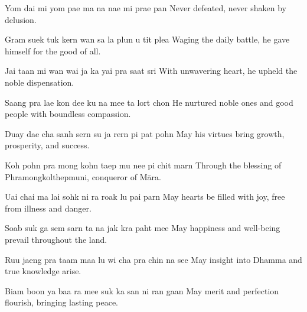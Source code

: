 \begin{chantsubsection}
\chantlinepair
{Yom dai mi yom pae}
{ma na nae mi prae pan}
{Never defeated, never shaken by delusion.}

\chantlinepair
{Gram suek tuk kern wan}
{sa la plun u tit plea}
{Waging the daily battle, he gave himself for the good of all.}

\chantlinepair
{Jai taan mi wan wai}
{ja ka yai pra saat sri}
{With unwavering heart, he upheld the noble dispensation.}

\chantlinepair
{Saang pra lae kon dee}
{ku na mee ta lort chon}
{He nurtured noble ones and good people with boundless compassion.}

\chantlinepair
{Duay dae cha sanh sern}
{su ja rern pi pat pohn}
{May his virtues bring growth, prosperity, and success.}

\chantlinepair
{Koh pohn pra mong kohn}
{taep mu nee pi chit marn}
{Through the blessing of Phramongkolthepmuni, conqueror of Māra.}

\chantlinepair
{Uai chai ma lai sohk}
{ni ra roak lu pai parn}
{May hearts be filled with joy, free from illness and danger.}

\chantlinepair
{Soab suk ga sem sarn}
{ta na jak kra paht mee}
{May happiness and well-being prevail throughout the land.}

\chantlinepair
{Ruu jaeng pra taam maa}
{lu wi cha pra chin na see}
{May insight into Dhamma and true knowledge arise.}

\chantlinepair
{Biam boon ya baa ra mee}
{suk ka san ni ran gaan}
{May merit and perfection flourish, bringing lasting peace.}

\end{chantsubsection}
